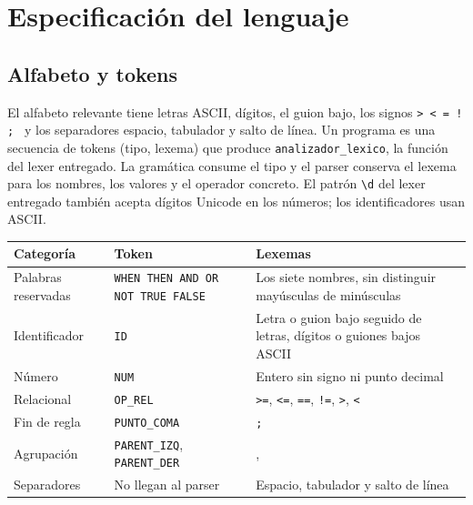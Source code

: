 \documentclass[11pt,a4paper]{article}
\newcommand{\tk}[1]{\texttt{#1}}
\begin{document}
\section{Especificación del lenguaje}

\subsection{Alfabeto y tokens}

El alfabeto relevante tiene letras ASCII, dígitos, el guion bajo, los
signos \tk{> < = ! ;  } y los separadores espacio, tabulador y
salto de línea. Un programa es una secuencia de tokens (tipo, lexema)
que produce \texttt{analizador\_lexico}, la función del lexer
entregado. La gramática consume el tipo y el parser conserva el
lexema para los nombres, los valores y el operador concreto.
El patrón \texttt{\textbackslash{}d} del lexer entregado también
acepta dígitos Unicode en los números; los identificadores usan ASCII.

\begin{xltabular}{\textwidth}{l l X}
  \toprule
  \textbf{Categoría}  & \textbf{Token}                    &
  \textbf{Lexemas}                                                    \\
  \midrule
  Palabras reservadas & \tk{WHEN THEN AND OR NOT TRUE FALSE} & Los
  siete nombres, sin distinguir mayúsculas de minúsculas         \\
  Identificador       & \tk{ID}                           & Letra o
  guion bajo seguido de letras, dígitos o guiones bajos ASCII \\
  Número              & \tk{NUM}                          & Entero
  sin signo ni punto decimal                                   \\
  Relacional          & \tk{OP\_REL}                      & \tk{>=},
  \tk{<=}, \tk{==}, \tk{!=}, \tk{>}, \tk{<}                  \\
  Fin de regla        & \tk{PUNTO\_COMA}                  & \tk{;}
  \\
  Agrupación          & \tk{PARENT\_IZQ}, \tk{PARENT\_DER} & \tk{},
  \tk{}                                                      \\
  Separadores         & No llegan al parser               & Espacio,
  tabulador y salto de línea                                 \\
  \bottomrule
\end{xltabular}
\end{document}
